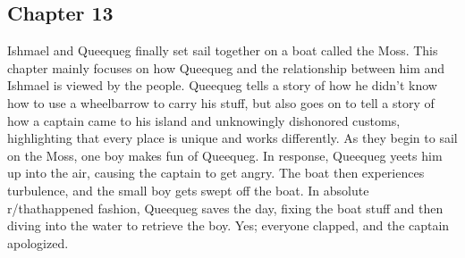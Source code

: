 \subsection{Chapter 13}

Ishmael and Queequeg finally set sail together on a boat called the Moss. This
chapter mainly focuses on how Queequeg and the relationship between him and
Ishmael is viewed by the people. Queequeg tells a story of how he didn't know
how to use a wheelbarrow to carry his stuff, but also goes on to tell a story
of how a captain came to his island and unknowingly dishonored customs,
highlighting that every place is unique and works differently. As they begin to
sail on the Moss, one boy makes fun of Queequeg. In response, Queequeg yeets
him up into the air, causing the captain to get angry. The boat then
experiences turbulence, and the small boy gets swept off the boat. In absolute
r/thathappened fashion, Queequeg saves the day, fixing the boat stuff and then
diving into the water to retrieve the boy. Yes; everyone clapped, and the
captain apologized.
